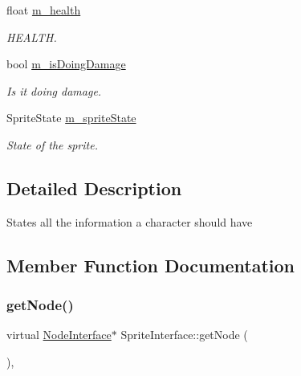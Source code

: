 \begin{DoxyCompactItemize}
\mbox{\label{class_sprite_interface_a8b0b188a190e0c1a7b30a7b0ca911b0f}} 
float \mbox{\hyperlink{class_sprite_interface_a8b0b188a190e0c1a7b30a7b0ca911b0f}{m\+\_\+health}}
\begin{DoxyCompactList}\small\item\em H\+E\+A\+L\+TH. \end{DoxyCompactList}\item 
\mbox{\label{class_sprite_interface_a161675cd2b32e41a30925da4617003b3}} 
bool \mbox{\hyperlink{class_sprite_interface_a161675cd2b32e41a30925da4617003b3}{m\+\_\+is\+Doing\+Damage}}
\begin{DoxyCompactList}\small\item\em Is it doing damage. \end{DoxyCompactList}\item 
\mbox{\label{class_sprite_interface_a4a0986e0b5bd14defa82eb7d9fe1886e}} 
Sprite\+State \mbox{\hyperlink{class_sprite_interface_a4a0986e0b5bd14defa82eb7d9fe1886e}{m\+\_\+sprite\+State}}
\begin{DoxyCompactList}\small\item\em State of the sprite. \end{DoxyCompactList}\end{DoxyCompactItemize}


\subsection{Detailed Description}
States all the information a character should have 

\subsection{Member Function Documentation}
\mbox{\label{class_sprite_interface_a0cda548d74975cb3dd3f4d163a1763b6}} 
\subsubsection{\texorpdfstring{get\+Node()}{getNode()}}
{\footnotesize\ttfamily virtual \mbox{\hyperlink{class_node_interface}{Node\+Interface}}$\ast$ Sprite\+Interface\+::get\+Node (\begin{DoxyParamCaption}{ }\end{DoxyParamCaption})\hspace{0.3cm}{\ttfamily [inline]}, {\ttfamily [virtual]}}



